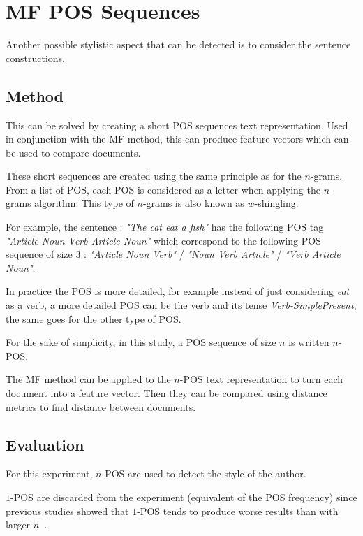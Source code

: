 \section{MF POS Sequences \label{sec:pos_sequences}}

Another possible stylistic aspect that can be detected is to consider the sentence constructions.

\subsection{Method}

This can be solved by creating a short POS sequences text representation.
Used in conjunction with the MF method, this can produce feature vectors which can be used to compare documents.

These short sequences are created using the same principle as for the $n$-grams.
From a list of POS, each POS is considered as a letter when applying the $n$-grams algorithm.
This type of $n$-grams is also known as $w$-shingling.

For example, the sentence : \textit{"The cat eat a fish"} has the following POS tag \textit{"Article Noun Verb Article Noun"} which correspond to the following POS sequence of size 3 : \textit{"Article Noun Verb"} / \textit{"Noun Verb Article"} / \textit{"Verb Article Noun"}.

In practice the POS is more detailed, for example instead of just considering \textit{eat} as a verb, a more detailed POS can be the verb and its tense \textit{Verb-SimplePresent}, the same goes for the other type of POS.

For the sake of simplicity, in this study, a POS sequence of size $n$ is written $n$-POS.

The MF method can be applied to the $n$-POS text representation to turn each document into a feature vector.
Then they can be compared using distance metrics to find distance between documents.

\subsection{Evaluation}

For this experiment, $n$-POS are used to detect the style of the author.

$1$-POS are discarded from the experiment (equivalent of the POS frequency) since previous studies showed that $1$-POS tends to produce worse results than with larger $n$~\cite{kocher_linking}.

